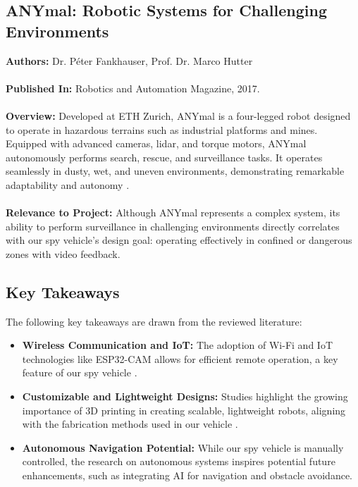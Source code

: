 \documentclass[12pt,a4paper]{report}
\begin{document}
\subsection{ANYmal: Robotic Systems for Challenging Environments}
\label{ANYmal: Robotic Systems for Challenging Environments}
\textbf{Authors:} Dr. Péter Fankhauser, Prof. Dr. Marco Hutter \\ \\
\textbf{Published In:} Robotics and Automation Magazine, 2017. \\ \\
\textbf{Overview:} Developed at ETH Zurich, ANYmal is a four-legged robot designed to operate in hazardous terrains such as industrial platforms and mines. Equipped with advanced cameras, lidar, and torque motors, ANYmal autonomously performs search, rescue, and surveillance tasks. It operates seamlessly in dusty, wet, and uneven environments, demonstrating remarkable adaptability and autonomy \cite{anymal}. \\ \\
\textbf{Relevance to Project:} Although ANYmal represents a complex system, its ability to perform surveillance in challenging environments directly correlates with our spy vehicle's design goal: operating effectively in confined or dangerous zones with video feedback.

\subsection{Key Takeaways}
\label{Key Takeaways}
The following key takeaways are drawn from the reviewed literature:

\begin{itemize}
    \item \textbf{Wireless Communication and IoT:} The adoption of Wi-Fi and IoT technologies like ESP32-CAM allows for efficient remote operation, a key feature of our spy vehicle \cite{esp32cam}.
    \item \textbf{Customizable and Lightweight Designs:} Studies highlight the growing importance of 3D printing in creating scalable, lightweight robots, aligning with the fabrication methods used in our vehicle \cite{3dprinting}.
    \item \textbf{Autonomous Navigation Potential:} While our spy vehicle is manually controlled, the research on autonomous systems inspires potential future enhancements, such as integrating AI for navigation and obstacle avoidance.
\end{itemize}
\end{document}

